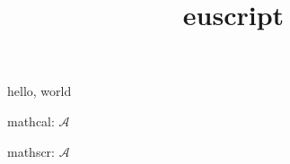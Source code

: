 \documentclass{amsart}
\title{euscript}
\begin{document}
\maketitle

hello, world

mathcal: $\mathcal{A}$

mathscr: $\mathscr{A}$
\end{document}
